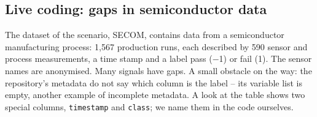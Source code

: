 \documentclass[
  letterpaper,
  DIV=11,
  numbers=noendperiod]{scrreprt}
\begin{document}
\subsection{Live coding: gaps in semiconductor
data}\label{live-coding-gaps-in-semiconductor-data}

The dataset of the scenario, SECOM, contains data from a semiconductor
manufacturing process: 1,567 production runs, each described by 590
sensor and process measurements, a time stamp and a label pass (−1) or
fail (1). The sensor names are anonymised. Many signals have gaps. A
small obstacle on the way: the repository's metadata do not say which
column is the label -- its variable list is empty, another example of
incomplete metadata. A look at the table shows two special columns,
\texttt{timestamp} and \texttt{class}; we name them in the code
ourselves.
\end{document}
